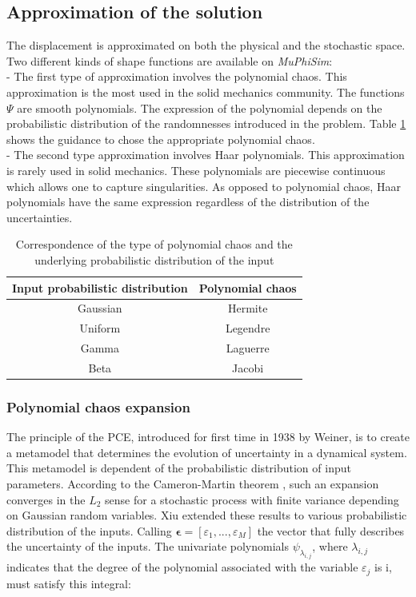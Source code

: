 \documentclass[oneside,11pt,times]{book}
\begin{document}
\subsection{Approximation of the solution}
The displacement is approximated on both the physical and the stochastic space. Two different kinds of shape functions are available on \textit{MuPhiSim}:\\
- The first type of approximation involves the polynomial chaos. This approximation is the most used in the solid mechanics community. The functions $\Psi$ are smooth polynomials. The expression of the polynomial depends on the probabilistic distribution of the randomnesses introduced in the problem. Table \ref{table:Wiener-Askey} shows the guidance to chose the appropriate polynomial chaos. \\
- The second type approximation involves Haar polynomials. This approximation is rarely used in solid mechanics. These polynomials are piecewise continuous which allows one to capture singularities. As opposed to polynomial chaos, Haar polynomials have the same expression regardless of the distribution of the uncertainties.
\begin{table}[h]
\begin{center}
\begin{tabular}{|c|c|}
  \hline
  Input probabilistic distribution & Polynomial chaos \\
  \hline
  \hline
  Gaussian & Hermite  \\
  \hline
  Uniform & Legendre  \\
  \hline
  Gamma & Laguerre \\
  \hline
  Beta & Jacobi \\
  \hline

\end{tabular}
\end{center}
\caption{Correspondence of the type of polynomial chaos and the underlying probabilistic distribution of the input } \label{table:Wiener-Askey}
\end{table}
\subsubsection{Polynomial chaos expansion\label{sec: PCE}}
The principle of the PCE, introduced for first time in 1938 by Weiner, is to create a metamodel that determines the evolution of uncertainty in a dynamical system. This metamodel is dependent of the probabilistic distribution of input parameters. According to the Cameron-Martin theorem , such an expansion converges in the $L_{2}$ sense for a stochastic process with finite variance depending on Gaussian random variables. Xiu extended these results to various probabilistic distribution of the inputs. Calling $\bm{\epsilon} = [\varepsilon_{1},...,\varepsilon_{M}]$ the vector that fully describes the uncertainty of the inputs. The univariate polynomials $\psi_{\lambda_{i,j}}$, where $\lambda_{i,j}$ indicates that the degree of the polynomial associated with the variable $\varepsilon_{j}$ is i, must satisfy this integral:
\end{document}
